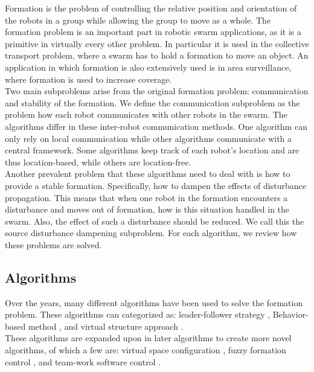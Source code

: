 
Formation is the problem of controlling the relative position and orientation of the robots in a group while allowing the group to move as a whole. \cite{consolini2008leader}
The formation problem is an important part in robotic swarm applications, as it is a primitive in virtually every other problem. 
In particular it is used in the collective transport problem, where a swarm has to hold a formation to move an object. 
An application in which formation is also extensively used is in area surveillance, where formation is used to increase coverage. \cite{burkle2011towards} \\

Two main subproblems arise from the original formation problem: communication and stability of the formation.
We define the communication subproblem as the problem how each robot communicates with other robots in the swarm.
The algorithms differ in these inter-robot communication methods.
One algorithm can only rely on local communication while other algorithms communicate with a central framework.
Some algorithms keep track of each robot's location and are thus location-based, while others are location-free. \\

Another prevalent problem that these algorithms need to deal with is how to provide a stable formation. 
Specifically, how to dampen the effects of disturbance propagation. 
This means that when one robot in the formation encounters a disturbance and moves out of formation, how is this situation handled in the swarm. 
Also, the effect of such a disturbance should be reduced. 
We call this the source disturbance dampening subproblem. 
For each algorithm, we review how these problems are solved.

\subsection{Algorithms}
Over the years, many different algorithms have been used to solve the formation problem. \cite{chen2005formation} \cite{consolini2008leader}
These algorithms can categorized as: leader-follower strategy \cite{consolini2008leader} \cite{das2002vision}, 
Behavior-based method \cite{balch1998behavior} \cite{lawton2003decentralized}, 
and virtual structure approach \cite{ren2004decentralized} \cite{do2007nonlinear}. \\
These algorithms are expanded upon in later algorithms to create more novel algorithms, of which a few are: 
virtual space configuration \cite{wee2013formation}, 
fuzzy formation control \cite{ranjbar2012novel},
and team-work software control \cite{kaminka2013use}. \\


